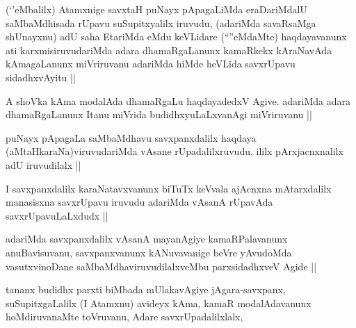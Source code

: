 
\begin{artha}
(`\stext'eMbalilx) Atamxnige savxtaH puNayx pApagaLiMda eraDariMdalU saMbaMdhisada rUpavu suSupitxyalilx iruvudu, (adariMda savaRsaMga shUnayxnu) adU saha EtariMda eMdu keVLidare (``\stext''eMdaMte) haqdayavanunx ati karxmisiruvudariMda adara dhamaRgaLanunx kamaRkekx kAraNavAda kAmagaLanunx miVriruvanu adariMda hiMde heVLida savxrUpavu sidadhxvAyitu ||
\end{artha}


\begin{artha}
A shoVka kAma modalAda dhamaRgaLu haqdayadedxV Agive. adariMda adara dhamaRgaLanunx Itanu miVrida budidhxyuLaLxvanAgi miVriruvanu ||
\end{artha}


\begin{artha}
puNayx pApagaLa saMbaMdhavu savxpanxdalilx haqdaya (aMtaHkaraNa)viruvudariMda vAsane rUpadalilxruvudu, ililx pArxjacnxnalilx adU iruvudilalx ||
\end{artha}


\begin{artha}
I savxpanxdalilx karaNatavxvanunx biTuTx keVvala ajAcnxna mAtarxdalilx manasisxna savxrUpavu iruvudu adariMda vAsanA rUpavAda savxrUpavuLaLxdudx ||
\end{artha}


\begin{artha}
adariMda savxpanxdalilx vAsanA mayanAgiye kamaRPalavanunx anuBavisuvanu, savxpanxvanunx kANuvavanige beVre yAvudoMda vasutxvinoDane saMbaMdhaviruvudilalxveMbu parxsidadhxveV Agide ||
\end{artha}

\begin{artha}
tananx budidhx parxti biMbada mUlakavAgiye jAgara-savxpanx, suSupitxgaLalilx (I Atamxnu) avideyx kAma, kamaR modalAdavanunx hoMdiruvanaMte toVruvanu, Adare savxrUpadalilxlalx, 
\end{artha}


